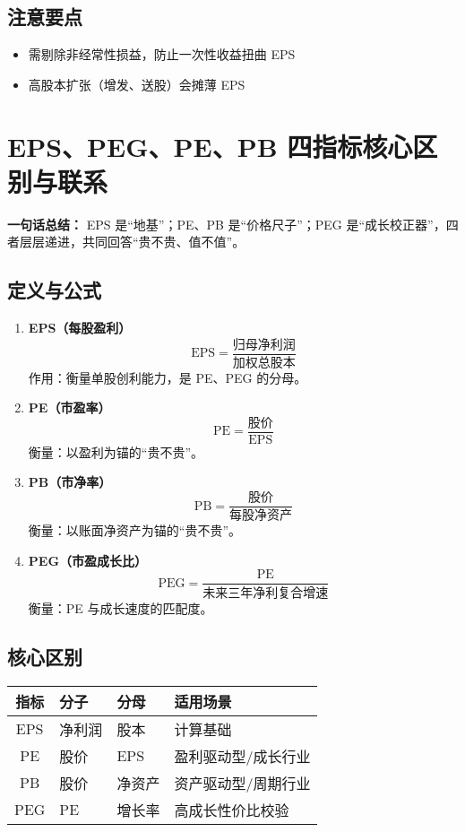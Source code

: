 \subsection{注意要点}
\begin{itemize}[leftmargin=*, nosep]
    \item 需剔除非经常性损益，防止一次性收益扭曲 EPS  
    \item 高股本扩张（增发、送股）会摊薄 EPS  
\end{itemize}

\section{EPS、PEG、PE、PB 四指标核心区别与联系}
\textbf{一句话总结：}  
EPS 是“地基”；PE、PB 是“价格尺子”；PEG 是“成长校正器”，四者层层递进，共同回答“贵不贵、值不值”。

\subsection{定义与公式}
\begin{enumerate}[leftmargin=*, nosep]
    \item \textbf{EPS（每股盈利）}  
    \[
    \text{EPS} = \frac{\text{归母净利润}}{\text{加权总股本}}
    \]
    作用：{\color{red}衡量单股创利能力}，是 PE、PEG 的分母。

    \item \textbf{PE（市盈率）}  
    \[
    \text{PE} = \frac{\text{股价}}{\text{EPS}}
    \]
    衡量：以{\color{red}盈利为锚}的“贵不贵”。

    \item \textbf{PB（市净率）}  
    \[
    \text{PB} = \frac{\text{股价}}{\text{每股净资产}}
    \]
    衡量：以{\color{red}账面净资产为锚}的“贵不贵”。

    \item \textbf{PEG（市盈成长比）}  
    \[
    \text{PEG} = \frac{\text{PE}}{\text{未来三年净利复合增速}}
    \]
衡量：{\color{red}PE 与成长速度的匹配度}。
\end{enumerate}

\subsection{核心区别}
\begin{table}[H]
\centering
\begin{tabular}{clll}
\toprule
指标 & 分子 & 分母 & 适用场景 \\
\midrule
EPS & 净利润 & 股本 & 计算基础 \\
PE  & 股价 & EPS & 盈利驱动型/成长行业 \\
PB  & 股价 & 净资产 & 资产驱动型/周期行业 \\
PEG & PE & 增长率 & 高成长性价比校验 \\
\bottomrule
\end{tabular}
\end{table}

